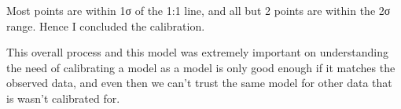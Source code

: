 \documentclass[titlepage,12pt]{unisubmission}
\begin{document}
Most points are within 1σ of the 1:1 line, and all but 2 points are within the 2σ range. Hence I concluded the calibration.

This overall process and this model was extremely important on understanding the need of calibrating a model as a model is only good enough if it matches the observed data, and even then we can't trust the same model for other data that is wasn't calibrated for.
\end{document}
